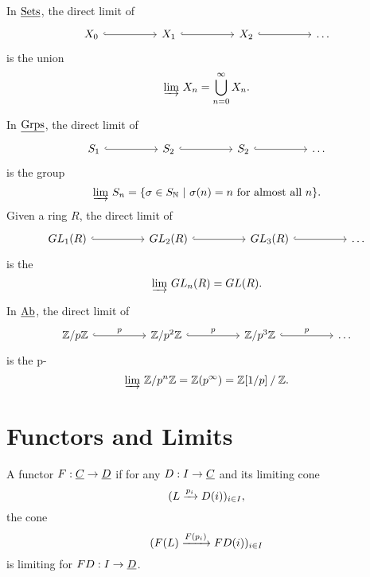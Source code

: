 \begin{examples*}
	\item In \( \underline{\mathrm{Sets}} \), the direct limit of
		\[
			\begin{tikzcd}{X_0} && {X_1} && {X_2} && \dotsc
				\arrow[hook, from=1-1, to=1-3]
				\arrow[hook, from=1-3, to=1-5]
				\arrow[hook, from=1-5, to=1-7]
			\end{tikzcd}
		\]
		is the union
		\[
			\varinjlim\, X_n = \bigcup\limits_{n=0}^\infty X_n.
		\]
	\item In \( \underline{\mathrm{Grps}} \), the direct limit of
		\[
			\begin{tikzcd}{S_1} && {S_2} && {S_2} && \dotsc
				\arrow[hook, from=1-1, to=1-3]
				\arrow[hook, from=1-3, to=1-5]
				\arrow[hook, from=1-5, to=1-7]
			\end{tikzcd}
		\]
		is the group
		\[
			\varinjlim\, S_n = \{\sigma \in S_{\mathbb{N}} ~|~ \sigma(n) = n \text{ for almost all } n\}.
		\]
		Given a ring \( R \), the direct limit of
		\[
			\begin{tikzcd}{GL_1(R)} && {GL_2(R)} && {GL_3(R)} && \dotsc
				\arrow[hook, from=1-1, to=1-3]
				\arrow[hook, from=1-3, to=1-5]
				\arrow[hook, from=1-5, to=1-7]
			\end{tikzcd}
		\]
		is the 
		\[
			\varinjlim\, GL_n(R) = GL(R).
		\]
	\item In \( \underline{\mathrm{Ab}} \), the direct limit of
		\[
			\begin{tikzcd}{\bb{Z}/p\bb{Z}} && {\bb{Z}/p^2\bb{Z}} && {\bb{Z}/p^3\bb{Z}} && \dotsc
				\arrow["p", hook, from=1-1, to=1-3]
				\arrow["p", hook, from=1-3, to=1-5]
				\arrow["p", hook, from=1-5, to=1-7]
			\end{tikzcd}
		\]
		is the p-
		\[
			\varinjlim\, \mathbb{Z}/p^n\mathbb{Z} = \mathbb{Z}(p^\infty) = \mathbb{Z}[1/p] \mathbin{/} \mathbb{Z}.
		\]
\end{examples*}

\section{Functors and Limits}

\begin{definition*}
	A functor \( F: \underline{C} \to \underline{D} \)  if for any \( D: I \to \underline{C} \) and its limiting cone
	\[
		(L \xrightarrow{p_i} D(i))_{i \in I},
	\]
	the cone
	\[
		(F(L) \xrightarrow{F(p_i)} FD(i))_{i \in I}
	\]
	is limiting for \( FD: I \to \underline{D} \).
\end{definition*}

